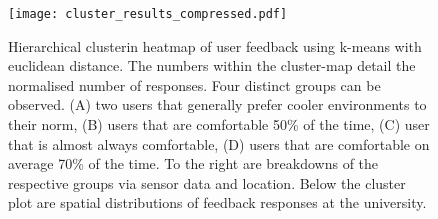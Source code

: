 



\begin{figure}
\begin{center}
\texttt{[image: cluster\_results\_compressed.pdf]}
\caption{Hierarchical clusterin heatmap of user feedback using k-means with euclidean distance. The numbers within the cluster-map detail the normalised number of responses. Four distinct groups can be observed. (A) two users that generally prefer cooler environments to their norm, (B) users that are comfortable 50\% of the time, (C) user that is almost always comfortable, (D) users that are comfortable on average 70\% of the time. To the right are breakdowns of the respective groups via sensor data and location. Below the cluster plot are spatial distributions of feedback responses at the university.}
\label{fig:clustering}
\end{center}
\end{figure}






